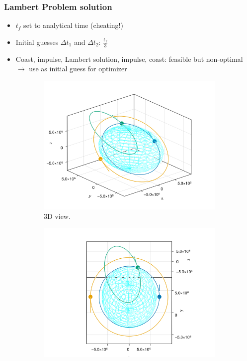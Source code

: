 \documentclass{beamer}
\begin{document}
\begin{frame}
    \frametitle{Lambert Problem solution}
    \begin{itemize}\pause
        \item \(t_f\) set to analytical time (cheating!) \pause
        \item Initial guesses \(\Delta t_1\) and \(\Delta t_2\): \(\frac{t_f}{3}\)\pause
        \item Coast, impulse, Lambert solution, impulse, coast: feasible but non-optimal \(\rightarrow\) use as initial guess for optimizer
    \end{itemize}
    
    \begin{figure}[htbp]
        \centering
        \begin{subfigure}{0.49\textwidth}
            \includegraphics[width=\textwidth]{../report/img/hohmann_lambert_guess.png}
            \caption{3D view.}
        \end{subfigure}
        \begin{subfigure}{0.49\textwidth}
            \includegraphics[width=\textwidth]{../report/img/hohmann_lambert_guess_in_plane.png}

\end{subfigure}
\end{figure}
\end{frame}
\end{document}
